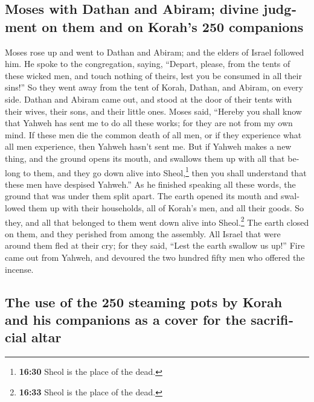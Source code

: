 \begin{paracol}{2}
\begin{otherlanguage}{english}
\hypertarget{moses-with-dathan-and-abiram-divine-judgment-on-them-and-on-korahs-250-companions}{%
\subsection{Moses with Dathan and Abiram; divine judgment on them and on
Korah's 250
companions}\label{moses-with-dathan-and-abiram-divine-judgment-on-them-and-on-korahs-250-companions}}

 Moses rose up and went to Dathan and Abiram; and the
elders of Israel followed him.  He spoke to the
congregation, saying, ``Depart, please, from the tents of these wicked
men, and touch nothing of theirs, lest you be consumed in all their
sins!''  So they went away from the tent of Korah,
Dathan, and Abiram, on every side. Dathan and Abiram came out, and stood
at the door of their tents with their wives, their sons, and their
little ones.  Moses said, ``Hereby you shall know that
Yahweh has sent me to do all these works; for they are not from my own
mind.  If these men die the common death of all men, or
if they experience what all men experience, then Yahweh hasn't sent me.
 But if Yahweh makes a new thing, and the ground opens
its mouth, and swallows them up with all that belong to them, and they
go down alive into Sheol,\footnote{\textbf{16:30} Sheol is the place of
  the dead.} then you shall understand that these men have despised
Yahweh.''  As he finished speaking all these words, the
ground that was under them split apart.  The earth opened
its mouth and swallowed them up with their households, all of Korah's
men, and all their goods.  So they, and all that belonged
to them went down alive into Sheol.\footnote{\textbf{16:33} Sheol is the
  place of the dead.} The earth closed on them, and they perished from
among the assembly.  All Israel that were around them
fled at their cry; for they said, ``Lest the earth swallow us up!''
 Fire came out from Yahweh, and devoured the two hundred
fifty men who offered the incense.

\hypertarget{the-use-of-the-250-steaming-pots-by-korah-and-his-companions-as-a-cover-for-the-sacrificial-altar}{%
\subsection{The use of the 250 steaming pots by Korah and his companions
as a cover for the sacrificial
altar}\label{the-use-of-the-250-steaming-pots-by-korah-and-his-companions-as-a-cover-for-the-sacrificial-altar}}


\end{otherlanguage}
\end{paracol}
